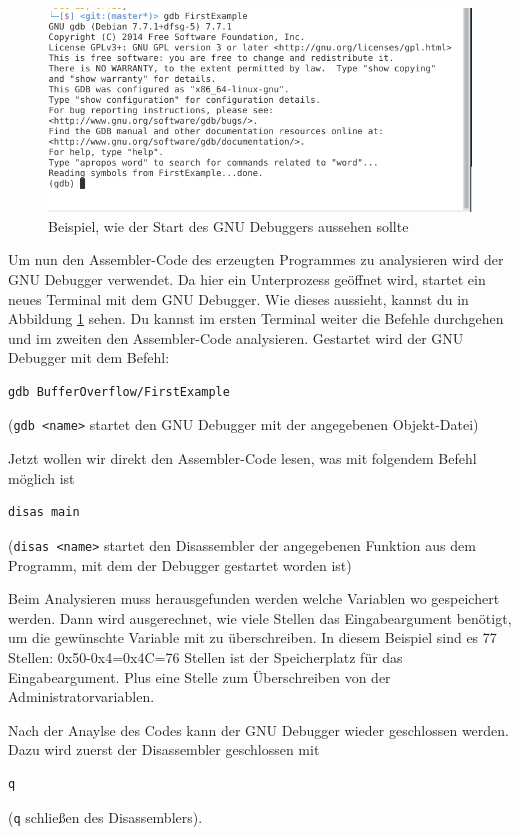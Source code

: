 \begin{figure}
	\centering
	\includegraphics[width=\textwidth]{images/BufferOverflow/gnuDebugger}
	\caption{Beispiel, wie der Start des GNU Debuggers aussehen sollte}
	\label{fig:gnuDebugger}
\end{figure}

Um nun den Assembler-Code des erzeugten Programmes zu analysieren wird der GNU Debugger verwendet. Da hier ein Unterprozess geöffnet wird, startet ein neues Terminal mit dem GNU Debugger. Wie dieses aussieht, kannst du in Abbildung \ref{fig:gnuDebugger} sehen. Du kannst im ersten Terminal weiter die Befehle durchgehen und im zweiten den Assembler-Code analysieren. Gestartet wird der GNU Debugger mit dem Befehl:
\begin{lstlisting}
gdb BufferOverflow/FirstExample
\end{lstlisting}
(\colorbox{altgray}{\lstinline|gdb <name>|} startet den GNU Debugger mit der angegebenen Objekt-Datei)

Jetzt wollen wir direkt den Assembler-Code lesen, was mit folgendem Befehl möglich ist
\begin{lstlisting}
disas main
\end{lstlisting}
(\colorbox{altgray}{\lstinline|disas <name>|} startet den Disassembler der angegebenen Funktion aus dem Programm, mit dem der Debugger gestartet worden ist)

Beim Analysieren muss herausgefunden werden welche Variablen wo gespeichert werden. Dann wird ausgerechnet, wie viele Stellen das Eingabeargument benötigt, um die gewünschte Variable mit zu überschreiben. In diesem Beispiel sind es 77 Stellen: 0x50-0x4=0x4C=76 Stellen ist der Speicherplatz für das Eingabeargument. Plus eine Stelle zum Überschreiben von der Administratorvariablen.

Nach der Anaylse des Codes kann der GNU Debugger wieder geschlossen werden. Dazu wird zuerst der Disassembler geschlossen mit
\begin{lstlisting}
q
\end{lstlisting}
(\colorbox{altgray}{\lstinline|q|} schließen des Disassemblers).

